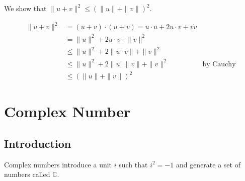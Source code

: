 		We show that $\|u+v\|^2 \leq (\|u\| + \|v\|)^2$.
		
		\begin{align}
			\|u+v\|^2 &= (u+v) \cdot (u+v) = u \cdot u + 2u \cdot v + v \dot v \\
				&= \|u\|^2 + 2u \cdot v + \|v\|^2 \\
				&\leq \|u\|^2 + 2\|u \cdot v \| + \|v\|^2  \\
				&\leq \|u\|^2 + 2\|u|\ \|v\| + \|v\|^2 & \textrm{by Cauchy} \\
				&\leq (\|u\| + \|v\|)^2
		\end{align}
		
\section{Complex Number}

	\subsection{Introduction}
	
		Complex numbers introduce a unit $i$ such that $i^2 = -1$ and generate a set of numbers called $\mathbb{C}$.